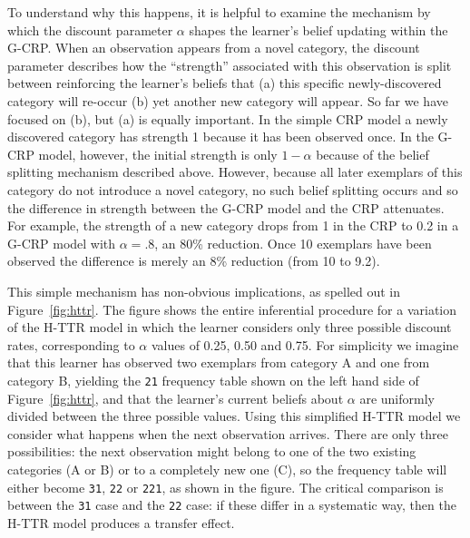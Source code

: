 \documentclass[doc]{apa6}
\newcommand{\dist}[1]{\texttt{#1}}
\begin{document}
To understand why this happens, it is helpful to examine the mechanism by which the discount parameter $\alpha$ shapes the learner's belief updating within the G-CRP. When an observation appears from a novel category, the discount parameter describes how the ``strength'' associated with this observation is split between reinforcing the learner's beliefs that (a) this specific newly-discovered category will re-occur (b) yet another new category will appear. So far we have focused on (b), but (a) is equally important. In the simple CRP model a newly discovered category has strength 1 because it has been observed once. In the G-CRP model, however, the initial strength is only $1-\alpha$ because of the belief splitting mechanism described above. However, because all later exemplars of this category do not introduce a novel category, no such belief splitting occurs and so the difference in strength between the G-CRP model and the CRP attenuates. For example, the strength of a new category drops from 1 in the CRP to 0.2 in a G-CRP model with $\alpha = .8$, an 80\% reduction. Once 10 exemplars have been observed the difference is merely an 8\% reduction (from 10 to 9.2).

This simple mechanism has non-obvious implications, as spelled out in Figure~\ref{fig:httr}. The figure shows the entire inferential procedure for a variation of the H-TTR model in which the learner considers only three possible discount rates, corresponding to $\alpha$ values of 0.25, 0.50 and 0.75. For simplicity we imagine that this learner has observed two exemplars from category A and one from category B, yielding the \dist{21} frequency table shown on the left hand side of Figure~\ref{fig:httr}, and that the learner's current beliefs about $\alpha$ are uniformly divided between the three possible values. Using this simplified H-TTR model we consider what happens when the next observation arrives. There are only three possibilities: the next observation might belong to one of the two existing categories (A or B) or to a completely new one (C), so the frequency table will either become \dist{31}, \dist{22} or \dist{221}, as shown in the figure. The critical comparison is between the \dist{31} case and the \dist{22} case: if these differ in a systematic way, then the H-TTR model produces a transfer effect.
\end{document}
